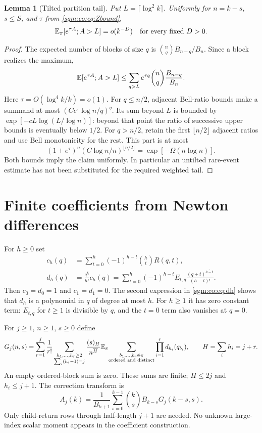 \documentclass[11pt,letterpaper]{article}
\newtheorem{lemma}[theorem]{Lemma}\newtheorem{proposition}[theorem]{Proposition}\newtheorem{corollary}[theorem]{Corollary}
\theoremstyle{remark}\newtheorem{remark}[theorem]{Remark}
\theoremstyle{definition}\newtheorem{definition}[theorem]{Definition}
\begin{document}
\begin{lemma}[Tilted partition tail]\label{sgm:co:lem:partitiontail}
Put $L=\lceil\log^2 k\rceil$. Uniformly for $n=k-s$, $s\le S$, and $\tau$ from \eqref{sgm:co:eq:Zbound},
\begin{equation}\label{sgm:co:eq:partitiontail}
 \mathbb E_\pi[e^{\tau A};A>L]=o(k^{-D})
 \quad\hbox{for every fixed }D>0.
\end{equation}
\end{lemma}
\begin{proof}
The expected number of blocks of size $q$ is $\binom nqB_{n-q}/B_n$. Since a block realizes the maximum,
\[
 \mathbb E[e^{\tau A};A>L]\le\sum_{q>L}e^{\tau q}\binom nq\frac{B_{n-q}}{B_n}.
\]
Here $\tau=O(\log^4k/k)=o(1)$. For $q\le n/2$, adjacent Bell-ratio bounds make a summand at most $(Ce^\tau\log n/q)^q$. Its sum beyond $L$ is bounded by $\exp[-cL\log(L/\log n)]$: beyond that point the ratio of successive upper bounds is eventually below $1/2$. For $q>n/2$, retain the first $\lfloor n/2\rfloor$ adjacent ratios and use Bell monotonicity for the rest. This part is at most
\[
 (1+e^\tau)^n(C\log n/n)^{\lfloor n/2\rfloor}
 =\exp[-\Omega(n\log n)].
\]
Both bounds imply the claim uniformly. In particular an untilted rare-event estimate has not been substituted for the required weighted tail.
\end{proof}

\section{Finite coefficients from Newton differences}\label{sgm:co:sec:coefficients}
For $h\ge0$ set
\begin{align}
 c_h(q)&=\sum_{t=0}^h(-1)^{h-t}\binom htR(q,t),\label{sgm:co:eq:ch}\\
 d_h(q)&=\frac{q^{\overline h}}{h!}c_h(q)
 =\sum_{t=0}^h(-1)^{h-t}E_{t,q}
          \frac{(q+t)^{\overline{h-t}}}{(h-t)!}.\label{sgm:co:eq:dh}
\end{align}
Then $c_0=d_0=1$ and $c_1=d_1=0$. The second expression in \eqref{sgm:co:eq:dh} shows that $d_h$ is a polynomial in $q$ of degree at most $h$. For $h\ge1$ it has zero constant term: $E_{t,q}$ for $t\ge1$ is divisible by $q$, and the $t=0$ term also vanishes at $q=0$.

For $j\ge1$, $n\ge1$, $s\ge0$ define
\begin{equation}\label{sgm:co:eq:Gj}
 G_j(n,s)=\sum_{r=1}^j\frac1{r!}
 \sum_{\substack{h_1,\ldots,h_r\ge2\\\sum_i(h_i-1)=j}}
 \frac{(s)_H}{n^{\overline H}}
 \mathbb E_\pi\!\sum_{\substack{b_1,\ldots,b_r\in\pi\\\text{ordered and distinct}}}
       \prod_{i=1}^rd_{h_i}(q_{b_i}),\qquad H=\sum_i h_i=j+r.
\end{equation}
An empty ordered-block sum is zero. These sums are finite; $H\le2j$ and $h_i\le j+1$. The correction transform is
\begin{equation}\label{sgm:co:eq:Aj}
 A_j(k)=\frac1{B_{k+1}}\sum_{s=0}^{k-1}\binom ksB_{k-s}G_j(k-s,s).
\end{equation}
Only child-return rows through half-length $j+1$ are needed. No unknown large-index scalar moment appears in the coefficient construction.
\end{document}
